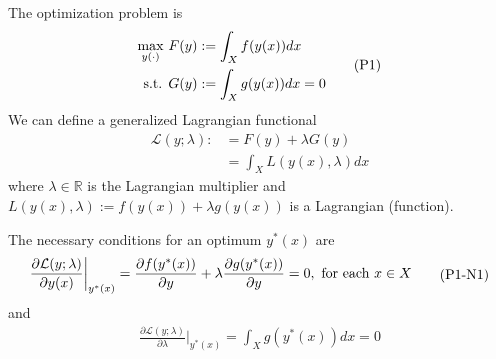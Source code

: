 \documentclass[11pt]{elegantbook}
\begin{document}
The optimization problem is
\begin{equation}
    \begin{aligned}
        \max_{y(\cdot)}\ &F(y):=\int_X f(y(x))dx\\
        \textnormal{s.t. }& G(y):=\int_X g(y(x))dx=0
    \end{aligned}
    \label{P1}
    \tag{P1}
\end{equation}
We can define a generalized Lagrangian functional
\begin{equation}
    \begin{aligned}
        \mathcal{L}(y;\lambda):&=F(y)+\lambda G(y)\\
        &=\int_X L(y(x),\lambda)dx
    \end{aligned}
    \nonumber
\end{equation}
where $\lambda\in \mathbb{R}$ is the Lagrangian multiplier and $L(y(x),\lambda):=f(y(x))+\lambda g(y(x))$ is a Lagrangian (function).

The necessary conditions for an optimum $y^*(x)$ are
\begin{equation}
    \begin{aligned}
        \frac{\partial \mathcal{L}(y;\lambda)}{\partial y(x)}\bigg|_{y^*(x)}=\frac{\partial f(y^*(x))}{\partial y}+\lambda \frac{\partial g(y^*(x))}{\partial y}=0, \textnormal{ for each }x\in X
    \end{aligned}
    \label{P1_N1}
    \tag{P1-N1}
\end{equation}
and
\begin{equation}
    \begin{aligned}
        \frac{\partial \mathcal{L}(y;\lambda)}{\partial \lambda}\bigg|_{y^*(x)}=\int_X g(y^*(x))dx=0
    \end{aligned}
    \label{P1_N2}
    \tag{P1-N2}
\end{equation}
\end{document}
